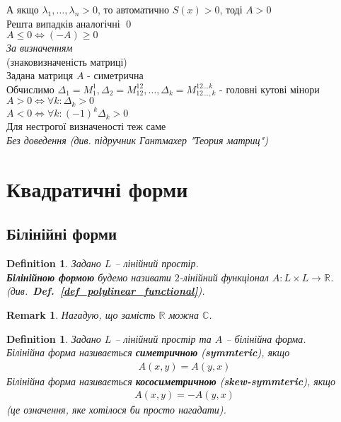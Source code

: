 \documentclass[a4paper, 10pt]{article}
\theoremstyle{theoremdd}
\newtheorem{definition}[theorem]{Definition}
\newtheorem{remark}[theorem]{Remark}
\newcommand\defref[1]{\textbf{Def.~\ref{#1}}}
\begin{document}
А якщо $\lambda_1,\dots,\lambda_n > 0$, то автоматично $S(x) > 0$, тоді $A>0$\\
Решта випадків аналогічні \qed
\bigskip \\
 $A \leq 0 \iff (-A) \geq 0$\\
\textit{За визначенням}
\bigskip \\
 (знаковизначеність матриці)\\
Задана матриця $A$ - симетрична\\
Обчислимо $\Delta_1 = M_1^1, \Delta_2 = M_{12}^{12}, \dots, \Delta_k = M^{12\dots k}_{12 \dots, k}$ - головні кутові мінори\\
$A>0 \iff \forall k: \Delta_k > 0$\\
$A < 0 \iff \forall k: (-1)^k \Delta_k > 0$\\
Для нестрогої визначеності теж саме\\
\textit{Без доведення (див. підручник Гантмахер "Теория матриц")}
\bigskip \\
\fi

\newpage


\section{Квадратичні форми}
\subsection{Білінійні форми}
\begin{definition}
Задано $L$ -- лінійний простір.\\
\textbf{Білінійною формою} будемо називати $2$-лінійний функціонал $A \colon L \times L \to \mathbb{R}$. (див.\ \defref{def_polylinear_functional}).
\end{definition}

\begin{remark}
Нагадую, що замість $\mathbb{R}$ можна $\mathbb{C}$.
\end{remark}

\begin{definition}
Задано $L$ -- лінійний простір та $A$ -- білінійна форма.\\
Білінійна форма називається \textbf{симетричною} (\textbf{symmteric}), якщо
\begin{align*}
A(x,y) = A(y,x)
\end{align*}
Білінійна форма називається \textbf{кососиметричною} (\textbf{skew-symmteric}), якщо
\begin{align*}
A(x,y) = -A(y,x)
\end{align*}
(це означення, яке хотілося би просто нагадати).
\end{definition}
\end{document}
